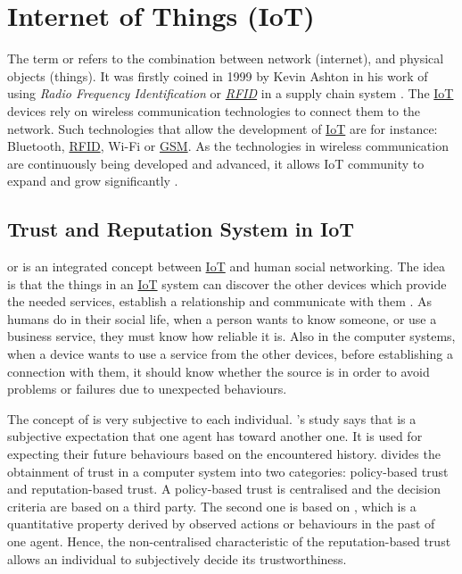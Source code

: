 \section{Internet of Things (IoT)} \label{Background-IoT}

\npara The term  or  refers to the combination between network (internet), and physical objects (things).
It was firstly coined in 1999 by Kevin Ashton in his work of using \textit{Radio Frequency Identification} or \textit{\hyperref[Acronym-RFID]{RFID}} in a supply chain system \citep{ThatIoT}.
The \hyperref[Acronym-IoT]{IoT} devices rely on wireless communication technologies to connect them to the network.
Such technologies that allow the development of \hyperref[Acronym-IoT]{IoT} are for instance: Bluetooth, \hyperref[Acronym-RFID]{RFID}, Wi-Fi or \hyperref[Acronym-GSM]{GSM}.
As the technologies in wireless communication are continuously being developed and advanced, it allows IoT community to expand and grow significantly \citep{IoTVisionFuture}.

\subsection{Trust and Reputation System in IoT} \label{Background-IoT-Reputation}

\npara {} or  is an integrated concept between \hyperref[Acronym-IoT]{IoT} and human social networking.
The idea is that the things in an \hyperref[Acronym-IoT]{IoT} system can discover the other devices which provide the needed services, establish a relationship and communicate with them \citep{SIoT}.
As humans do in their social life, when a person wants to know someone, or use a business service, they must know how reliable it is.
Also in the computer systems, when a device wants to use a service from the other devices, before establishing a connection with them, it should know whether the source is  in order to avoid problems or failures due to unexpected behaviours.

\npara The concept of  is very subjective to each individual.
\cite{ComputationalModelTrust}'s study says that  is a subjective expectation that one agent has toward another one.
It is used for expecting their future behaviours based on the encountered history.
\cite{SurveyOfTrustInComputerScience} divides the obtainment of trust in a computer system into two categories: policy-based trust and reputation-based trust.
A policy-based trust is centralised and the decision criteria are based on a third party.
The second one is based on , which is a quantitative property derived by observed actions or behaviours in the past of one agent.
Hence, the non-centralised characteristic of the reputation-based trust allows an individual to subjectively decide its trustworthiness.

